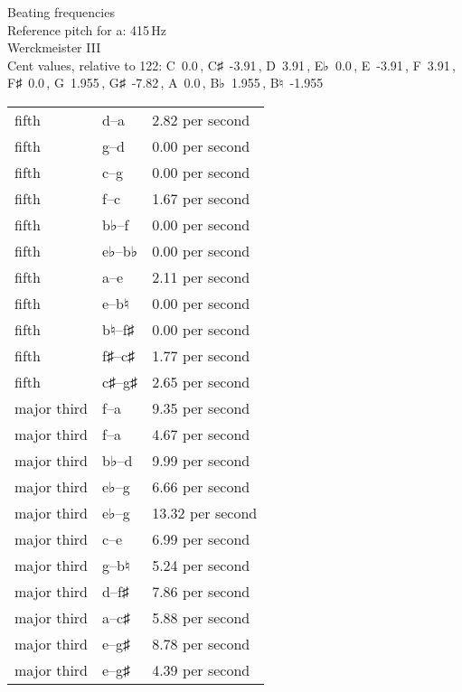 \documentclass{standalone}
\def\str{\textquotesingle}
\def\cn{\textcent}
\begin{document}
\begin{minipage}{8cm}
\begin{center}
  {\Large Beating frequencies}\\[2ex]
  Reference pitch for a\str: 415\,Hz\\[1ex]
  Werckmeister III\\[1ex]
  Cent values, relative to 122: C~0.0\,\cn, C♯~-3.91\,\cn, D~3.91\,\cn, E♭~0.0\,\cn, E~-3.91\,\cn, F~3.91\,\cn, F♯~0.0\,\cn, G~1.955\,\cn, G♯~-7.82\,\cn, A~0.0\,\cn, B♭~1.955\,\cn, B♮~-1.955\,\cn
\end{center}
\begin{longtable}{p{2cm}p{1cm}p{3cm}}
  \toprule
  fifth & d\str--a\str & 2.82 per second \\fifth & g--d\str & 0.00 per second \\fifth & c\str--g\str & 0.00 per second \\fifth & f--c\str & 1.67 per second \\fifth & b♭--f\str & 0.00 per second \\fifth & e♭--b♭ & 0.00 per second \\fifth & a--e\str & 2.11 per second \\fifth & e--b♮ & 0.00 per second \\fifth & b♮--f♯\str & 0.00 per second \\fifth & f♯--c♯\str & 1.77 per second \\fifth & c♯\str--g♯\str & 2.65 per second \\major third & f\str--a\str & 9.35 per second \\major third & f--a & 4.67 per second \\major third & b♭--d\str & 9.99 per second \\major third & e♭--g & 6.66 per second \\major third & e♭\str--g\str & 13.32 per second \\major third & c\str--e\str & 6.99 per second \\major third & g--b♮ & 5.24 per second \\major third & d\str--f♯\str & 7.86 per second \\major third & a--c♯\str & 5.88 per second \\major third & e\str--g♯\str & 8.78 per second \\major third & e--g♯ & 4.39 per second \\
  \bottomrule
\end{longtable}
\end{minipage}
\end{document}
